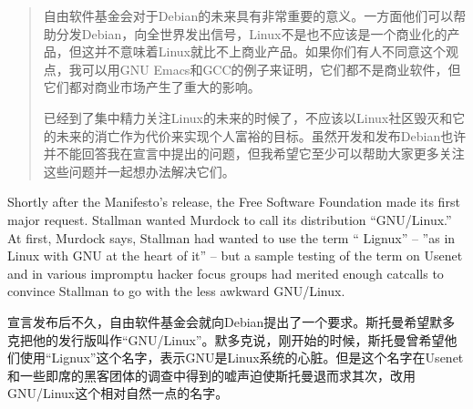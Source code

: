 \ifdefined\chs
\begin{quote}
自由软件基金会对于Debian的未来具有非常重要的意义。一方面他们可以帮助分发Debian，向全世界发出信号，Linux不是也不应该是一个商业化的产品，但这并不意味着Linux就比不上商业产品。如果你们有人不同意这个观点，我可以用GNU Emacs和GCC的例子来证明，它们都不是商业软件，但它们都对商业市场产生了重大的影响。

已经到了集中精力关注Linux的未来的时候了，不应该以Linux社区毁灭和它的未来的消亡作为代价来实现个人富裕的目标。虽然开发和发布Debian也许并不能回答我在宣言中提出的问题，但我希望它至少可以帮助大家更多关注这些问题并一起想办法解决它们。
\end{quote}
\fi

\ifdefined\eng
Shortly after the Manifesto's release, the Free Software Foundation made its first major request. Stallman wanted Murdock to call its distribution ``GNU/Linux.'' At first, Murdock says, Stallman had wanted to use the term `` Lignux'' -- ''as in Linux with GNU at the heart of it'' -- but a sample testing of the term on Usenet and in various impromptu hacker focus groups had merited enough catcalls to convince Stallman to go with the less awkward GNU/Linux.
\fi

\ifdefined\chs
宣言发布后不久，自由软件基金会就向Debian提出了一个要求。斯托曼希望默多克把他的发行版叫作``GNU/Linux''。默多克说，刚开始的时候，斯托曼曾希望他们使用``Lignux''这个名字，表示GNU是Linux系统的心脏。但是这个名字在Usenet和一些即席的黑客团体的调查中得到的嘘声迫使斯托曼退而求其次，改用GNU/Linux这个相对自然一点的名字。
\fi


